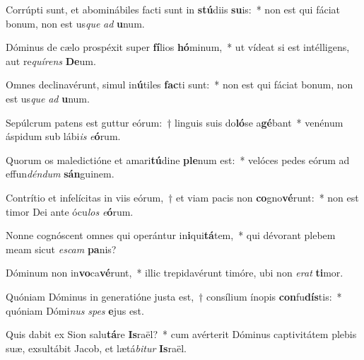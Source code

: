 \item Corrúpti sunt, et abominábiles facti sunt in \textbf{stú}diis \textbf{su}is:~* non est qui fáciat bonum, non est us\textit{que} \textit{ad} \textbf{u}num.
\item Dóminus de cælo prospéxit super \textbf{fí}lios \textbf{hó}minum,~* ut vídeat si est intélligens, aut re\textit{quí}\textit{rens} \textbf{De}um.
\item Omnes declinavérunt, simul in\textbf{ú}tiles \textbf{fac}ti sunt:~* non est qui fáciat bonum, non est us\textit{que} \textit{ad} \textbf{u}num.
\item Sepúlcrum patens est guttur eórum:~† linguis suis do\textbf{ló}se a\textbf{gé}bant~* venénum áspidum sub lábi\textit{is} \textit{e}\textbf{ó}rum.
\item Quorum os maledictióne et amari\textbf{tú}dine \textbf{ple}num est:~* velóces pedes eórum ad effun\textit{dén}\textit{dum} \textbf{sán}guinem.
\item Contrítio et infelícitas in viis eórum,~† et viam pacis non \textbf{co}gno\textbf{vé}runt:~* non est timor Dei ante ócu\textit{los} \textit{e}\textbf{ó}rum.
\item Nonne cognóscent omnes qui operántur in\textbf{i}qui\textbf{tá}tem,~* qui dévorant plebem meam sicut \textit{es}\textit{cam} \textbf{pa}nis?
\item Dóminum non in\textbf{vo}ca\textbf{vé}runt,~* illic trepidavérunt timóre, ubi non \textit{e}\textit{rat} \textbf{ti}mor.
\item Quóniam Dóminus in generatióne justa est,~† consílium ínopis \textbf{con}fu\textbf{dís}tis:~* quóniam Dómi\textit{nus} \textit{spes} \textbf{e}jus est.
\item Quis dabit ex Sion salu\textbf{tá}re \textbf{Is}raël?~* cum avérterit Dóminus captivitátem plebis suæ, exsultábit Jacob, et lætá\textit{bi}\textit{tur} \textbf{Is}raël.
